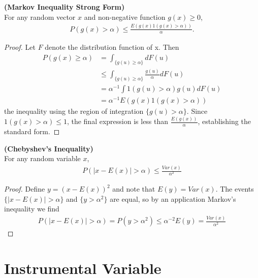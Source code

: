 \documentclass[11pt]{article} %
\theoremstyle{definition}
\numberwithin{defn}{subsection}
\numberwithin{thm}{subsection}
\numberwithin{ex}{subsection}
\begin{document}
\begin{thm}\label{thm:markovineqstrong}
	\textbf{(Markov Inequality Strong Form)}\\
	For any random vector $x$ and non-negative function $g(x)\ge 0$,
	\begin{align*}
	P(g(x)>\alpha)\le\frac{E(g(x)1(g(x)>\alpha))}{\alpha}.
	\end{align*}
	
	\begin{proof}
		Let $F$ denote the distribution function of x. Then
		\begin{align*}
		P(g(x)\ge\alpha)&=\int_{\{g(u)\ge\alpha\}}dF(u)\\
		&\le\int_{\{g(u)\ge\alpha\}}\frac{g(u)}{\alpha}dF(u)\\
		&=\alpha^{-1}\int 1(g(u)>\alpha)g(u)dF(u)\\
		&=\alpha^{-1} E(g(x)1(g(x)>\alpha))
		\end{align*}
		the inequality using the region of integration $\{g(u)>\alpha\}$. Since $1(g(x)>\alpha)\le 1$, the final expression is less than $\frac{E(g(x))}{\alpha}$, establishing the standard form.
	\end{proof}
\end{thm}

\begin{thm}\label{thm:chebyshevineq}
	\textbf{(Chebyshev's Inequality)}\\
	For any random variable $x$,
	\begin{align*}
	P(|x-E(x)|>\alpha)\le\frac{Var(x)}{\alpha^2}
	\end{align*}
	
	\begin{proof}
		Define $y=(x-E(x))^2$ and note that $E(y)=Var(x)$. The events $\{|x-E(x)|>\alpha\}$ and $\{y>\alpha^2\}$ are equal, so by an application Markov's inequality we find
		\begin{align*}
		P(|x-E(x)|>\alpha)=P(y>\alpha^2)\le\alpha^{-2}E(y)=\frac{Var(x)}{\alpha^2}
		\end{align*}
	\end{proof}
\end{thm}
\clearpage

\section{Instrumental Variable}



\newpage


\end{document}
